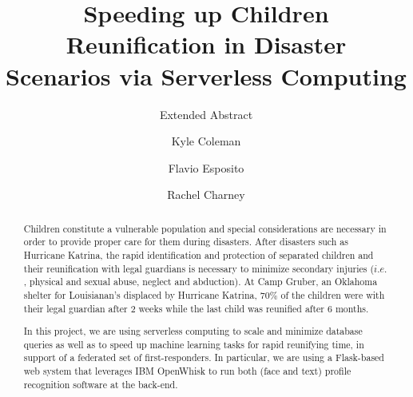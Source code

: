 \documentclass[sigconf]{acmart}
\begin{document}
\title{Speeding up  Children Reunification in Disaster \\ Scenarios via Serverless Computing}
\subtitle{Extended Abstract}


\author{Kyle Coleman\superscript}
%
\author{Flavio Esposito}
%
\author{Rachel Charney}


\maketitle


\begin{abstract}
Children constitute a vulnerable population and special considerations are necessary in order to provide proper care for them during disasters. After disasters such as Hurricane Katrina, the rapid identification and protection of separated children and their reunification with legal guardians is necessary to minimize secondary injuries ($i.e.$, physical and sexual abuse, neglect and abduction). At Camp Gruber, an Oklahoma shelter for Louisianan's displaced by Hurricane Katrina, $70\%$ of the children were with their legal guardian after 2 weeks while the last child was reunified after 6 months. 

In this project, we are using serverless computing to scale and minimize database queries as well as to speed up machine learning tasks for rapid reunifying time, in support of a federated set of first-responders. In particular, we are using a Flask-based web system that leverages IBM OpenWhisk to run both (face and text) profile recognition software at the back-end.
\end{abstract}
\end{document}
